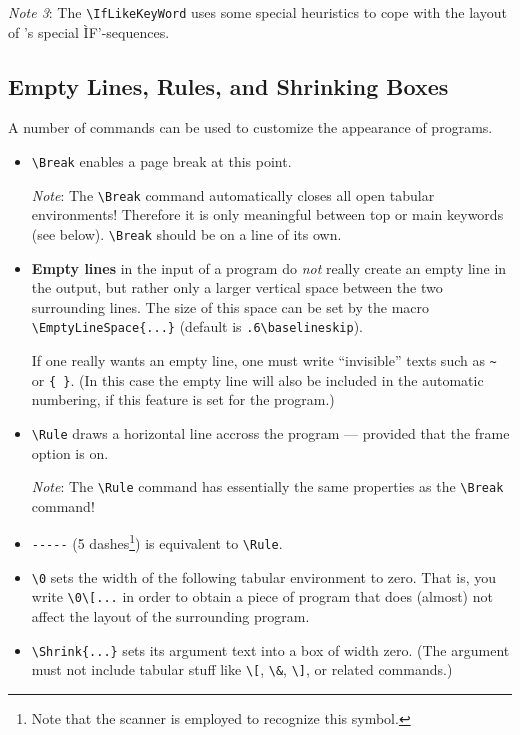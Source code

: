 \emph{Note 3}: The \verb+\IfLikeKeyWord+ uses some special heuristics to
cope with the layout of \Opal's special \`IF'-sequences.





\subsection{Empty Lines, Rules, and Shrinking Boxes}
\label{sec:Additional}

A number of commands can be used to customize the appearance of programs.

\begin{itemize}
  \item \verb+\Break+ enables a page break at this point.
    
    \emph{Note}: The \verb=\Break= command automatically closes all open
    tabular environments! Therefore it is only meaningful between top or
    main keywords (see below). \verb+\Break+ should be on a line of its own.

  \item \textbf{Empty lines} in the input of a program do \emph{not} really
    create an empty line in the output, but rather only a larger
    vertical space between the two surrounding lines. The size of this
    space can be set by the macro \verb+\EmptyLineSpace{...}+ (default is
    \verb+.6\baselineskip+).

    If one really wants an empty line, one must write ``invisible'' texts
    such as \verb+~+ or \verb+{ }+. (In this case the empty line will also
    be included in the automatic numbering, if this feature is set for the
    program.) 

  \item \verb=\Rule= draws a horizontal line accross the program ---
    provided that the frame option is on.

    \emph{Note}: The \verb+\Rule+ command has essentially the same
    properties as the \verb+\Break+ command!
    
  \item \verb+-----+ (5 dashes\footnote{Note that the scanner is employed
      to recognize this symbol.}) is equivalent to \verb+\Rule+.

  \item \verb=\0= sets the width of the following tabular environment to
    zero. That is, you write \verb=\0\[...= in order to obtain a piece of
    program that does (almost) not affect the layout of the surrounding
    program.

  \item \verb+\Shrink{...}+ sets its argument text into a box of width
    zero. (The argument must not include tabular stuff like \verb+\[+,
    \verb+\&+, \verb+\]+, or related commands.)
\end{itemize}





